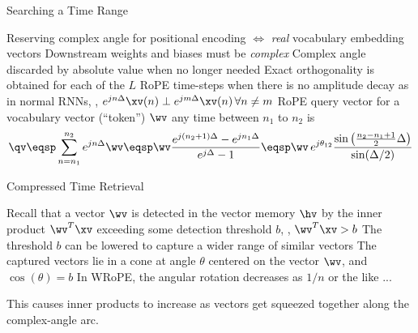 
\begin{slide}[\slideopts,toc={}]{Searching a Time Range}
\vspace{-1em}
\begin{itemize}
  \mpitem Reserving complex angle for positional encoding $\Leftrightarrow$ \emph{real} vocabulary
          embedding vectors
  \mpitem Downstream weights and biases must be \emph{complex}
  \mpitem Complex angle discarded by absolute value when no longer needed
  \mpitem Exact orthogonality is obtained for each of the $L$ RoPE time-steps when there is
  no amplitude decay as in normal RNNs, \ie, $e^{jn\Delta}\xv(n)\perp e^{jm\Delta}\xv(n)\, \forall n\ne m$
  \mpitem RoPE query vector for a vocabulary vector (``token'') $\wv$ any time between $n_1$ to $n_2$ is
   \[
   \qv \eqsp \sum_{n=n_1}^{n_2}e^{jn \Delta}\wv
   \eqsp \wv \frac{e^{j(n_2+1)\Delta} - e^{jn_1\Delta}}{e^{j\Delta}-1}
   \eqsp \wv\, e^{j\theta_{12}}\frac{\sin\left(\frac{n_2-n_1+1}{2}\Delta\right)}{\sin(\Delta/2)}
   \]
   \vspace{-1em}
\end{itemize}
\end{slide}

\begin{slide}[\slideopts,toc={Compressed Time}]{Compressed Time Retrieval}
\begin{itemize}
  \mpitem Recall that a vector $\wv$ is detected in the vector memory $\hv$ by the inner product $\wv^T\xv$
  exceeding some detection threshold $b$, \ie, $\wv^T\xv > b$
  \mpitem The threshold $b$ can be lowered to capture a wider range of similar vectors
  \mpitem The captured vectors lie in a cone at angle $\theta$ centered on the vector $\wv$,
  and $\cos(\theta)=b$
  \mpitem In WRoPE, the angular rotation decreases as $1/n$ or the like
  \mpitem ...
\end{itemize}
This causes inner products to increase as vectors get squeezed together along the complex-angle arc.
\end{slide}

